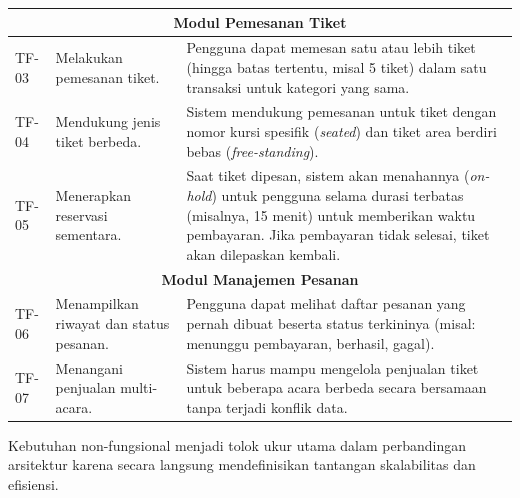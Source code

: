 \begin{longtable}{|l|p{}|p{}|}
    \hline
    \multicolumn{3}{|c|}{\textbf{Modul Pemesanan Tiket}}                                                                                                                                                                                                                              \\
    \hline
    TF-03       & Melakukan pemesanan tiket.              & Pengguna dapat memesan satu atau lebih tiket (hingga batas tertentu, misal 5 tiket) dalam satu transaksi untuk kategori yang sama.                                                                                        \\
    \hline
    TF-04       & Mendukung jenis tiket berbeda.          & Sistem mendukung pemesanan untuk tiket dengan nomor kursi spesifik (\textit{seated}) dan tiket area berdiri bebas (\textit{free-standing}).                                                                               \\
    \hline
    TF-05       & Menerapkan reservasi sementara.         & Saat tiket dipesan, sistem akan menahannya (\textit{on-hold}) untuk pengguna selama durasi terbatas (misalnya, 15 menit) untuk memberikan waktu pembayaran. Jika pembayaran tidak selesai, tiket akan dilepaskan kembali. \\
    \hline
    \multicolumn{3}{|c|}{\textbf{Modul Manajemen Pesanan}}                                                                                                                                                                                                                            \\
    \hline
    TF-06       & Menampilkan riwayat dan status pesanan. & Pengguna dapat melihat daftar pesanan yang pernah dibuat beserta status terkininya (misal: menunggu pembayaran, berhasil, gagal).                                                                                         \\
    \hline
    TF-07       & Menangani penjualan multi-acara.        & Sistem harus mampu mengelola penjualan tiket untuk beberapa acara berbeda secara bersamaan tanpa terjadi konflik data.                                                                                                    \\
\end{longtable}
\endgroup

\pagebreak

Kebutuhan non-fungsional menjadi tolok ukur utama dalam perbandingan arsitektur karena secara langsung mendefinisikan tantangan skalabilitas dan efisiensi.

